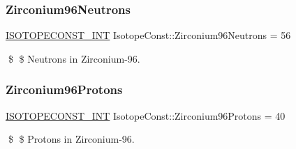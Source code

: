 \subsubsection{\texorpdfstring{Zirconium96\+Neutrons}{Zirconium96Neutrons}}
{\footnotesize\ttfamily \mbox{\hyperlink{group___isotope_const-_macros_ga5f18360b3e99483a35c32d789e62621c}{I\+S\+O\+T\+O\+P\+E\+C\+O\+N\+S\+T\+\_\+\+I\+NT}} Isotope\+Const\+::\+Zirconium96\+Neutrons = 56}

\$ \$ Neutrons in Zirconium-\/96. \mbox{\label{group___isotope_const-_zirconium-_zr96_gaf07b7317c8cd90ad25cad6188e53a3b1}} 
\subsubsection{\texorpdfstring{Zirconium96\+Protons}{Zirconium96Protons}}
{\footnotesize\ttfamily \mbox{\hyperlink{group___isotope_const-_macros_ga5f18360b3e99483a35c32d789e62621c}{I\+S\+O\+T\+O\+P\+E\+C\+O\+N\+S\+T\+\_\+\+I\+NT}} Isotope\+Const\+::\+Zirconium96\+Protons = 40}

\$ \$ Protons in Zirconium-\/96. 